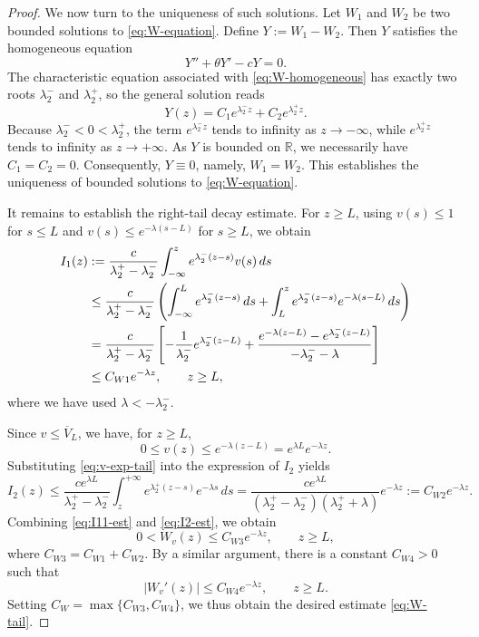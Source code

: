 \documentclass[preprint,sort&compress,final,12pt]{elsarticle}
\numberwithin{equation}{section}
\begin{document}
\begin{proof}
We now turn to the uniqueness of such solutions. Let $W_1$ and $W_2$ be two bounded solutions to \eqref{eq:W-equation}. Define $Y:=W_1-W_2$. Then $Y$ satisfies the homogeneous equation
\begin{equation}\label{eq:W-homogeneous}
Y''+\theta Y'-cY=0.
\end{equation}
The characteristic equation associated with \eqref{eq:W-homogeneous} has exactly two roots $\lambda_2^-$ and $\lambda_2^+$, so the general solution reads
\begin{equation*}
Y(z)=C_1e^{\lambda_2^-z}+C_2e^{\lambda_2^+z}.
\end{equation*}
Because $\lambda_2^-<0<\lambda_2^+$, the term $e^{\lambda_2^-z}$ tends to infinity as $z\to-\infty$, while $e^{\lambda_2^+z}$ tends to infinity as $z\to+\infty$. As $Y$ is bounded on $\mathbb R$, we necessarily have $C_1=C_2=0$. Consequently, $Y\equiv 0$, namely, $W_1=W_2$. This establishes the uniqueness of bounded solutions to \eqref{eq:W-equation}.

It remains to establish the right-tail decay estimate. For $z\ge L$, using $v(s)\le 1$ for $s\le L$ and $v(s)\le e^{-\lambda(s-L)}$ for $s\ge L$, we obtain
\begin{align}\label{eq:I11-est}
I_1(z)&:=\frac{c}{\lambda_2^+-\lambda_2^-}\int_{-\infty}^{z}e^{\lambda_2^-(z-s)}v(s)\,ds \notag\\
&\le \frac{c}{\lambda_2^+-\lambda_2^-}
\left(\int_{-\infty}^{L}e^{\lambda_2^-(z-s)}\,ds+\int_{L}^{z}e^{\lambda_2^-(z-s)}e^{-\lambda(s-L)}\,ds\right)\notag\\
&=\frac{c}{\lambda_2^+-\lambda_2^-}\left[-\frac{1}{\lambda_2^-}e^{\lambda_2^-(z-L)}+\frac{e^{-\lambda(z-L)}-e^{\lambda_2^-(z-L)}}{-\lambda_2^--\lambda}\right]\notag\\
&\le C_{W1}e^{-\lambda z},\qquad z\ge L,
\end{align}
where we have used $\lambda<-\lambda_2^-$.

Since $v\le\overline V_L$, we have, for $z\ge L$,
\begin{equation}\label{eq:v-exp-tail}
0\le v(z)\le e^{-\lambda(z-L)}=e^{\lambda L}e^{-\lambda z}.
\end{equation}
Substituting \eqref{eq:v-exp-tail} into the expression of $I_2$ yields
\begin{equation}\label{eq:I2-est}
I_2(z)\le \frac{ce^{\lambda L}}{\lambda_2^+-\lambda_2^-} \int_z^{+\infty}e^{\lambda_2^+(z-s)}e^{-\lambda s}\,ds
=\frac{ce^{\lambda L}}{(\lambda_2^+-\lambda_2^-)(\lambda_2^++\lambda)}e^{-\lambda z}:=C_{W2}e^{-\lambda z}.
\end{equation}
Combining \eqref{eq:I11-est} and \eqref{eq:I2-est},  we obtain
\begin{equation*}
0<W_v(z)\le C_{W3}e^{-\lambda z},\qquad z\ge L,
\end{equation*}
where $C_{W3}=C_{W1}+C_{W2}$. By  a similar argument, there is a constant $C_{W4}>0$ such that
\begin{equation*}
|W_v'(z)|\le C_{W4}e^{-\lambda z},\qquad z\ge L.
\end{equation*}
Setting $C_{W}=\max\{C_{W3},C_{W4}\}$, we thus obtain the desired estimate \eqref{eq:W-tail}.



\end{proof}
\end{document}
